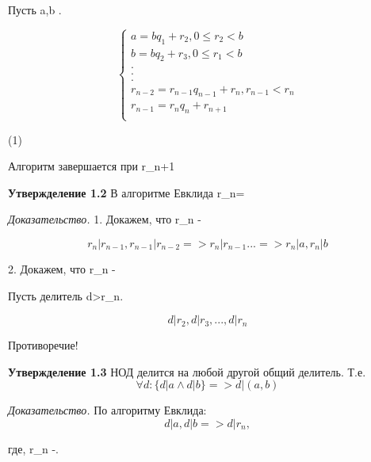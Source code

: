 \documentclass[a4paper]{article}
\begin{document}
Пусть a,b \in  {}. 

\[
\left\{
\begin{aligned}
a=bq_{1}+r_{2}, 0 \le r_{2} <b \\
b=bq_{2}+r_{3}, 0 \le r_{1} <b \\
. \\
. \\
. \\
r_{n-2}=r_{n-1}q_{n-1}+r_{n}, r_{n-1}<r_{n}\\
r_{n-1}=r_{n}q_{n}+r_{n+1}\\                           
\end{aligned}
\right.
\]

\begin{flushright}
  (1)
\end{flushright}

Алгоритм завершается при r_{n+1}

\noindent\textbf{Утвержделение 1.2} В алгоритме Евклида r_{n}=\\ 

\textit{Доказательство.} 1. Докажем, что r_{n} - \\ 

\[
r_{n}|r_{n-1}, r_{n-1}|r_{n-2} => r_{n}|r_{n-1} ... =>  r_{n}|a, r_{n}|b
\]

2. Докажем, что r_{n} - 

Пусть делитель d>r_{n}.

\[
d|r_{2}, d|r_{3}, ... , d|r_{n}
\]

Противоречие!

\noindent\textbf{Утвержделение 1.3} НОД делится на любой другой общий делитель. Т.е.
\[
\forall d:\lbrace d|a\wedge d|b\rbrace => d|(a,b)
\]

\textit{Доказательство.} По алгоритму Евклида:
\[
d|a, d|b => d|r_{n},
\]

где, r_{n} -.
\end{document}
